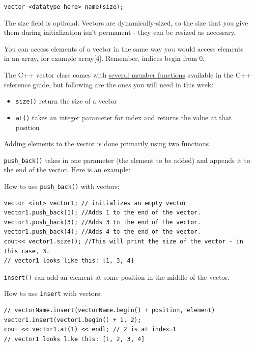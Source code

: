\texttt{vector <datatype_here> name(size);}

The size field is optional. Vectors are dynamically-sized, so the size that you give them during initialization isn't permanent - they can be resized as necessary.

You can access elements of a vector in the same way you would access elements in an array, for example array[4]. Remember, indices begin from 0.

The C++ vector class comes with \textcolor{cyan}{\href{https://www.cplusplus.com/reference/vector/vector/vector/}{several member functions}} available in the C++ reference guide, but following are the ones you will need in this week:

\begin{itemize}
    \item \texttt{size()} return the size of a vector
    \item \texttt{at()} takes an integer parameter for index and returns the value at that position
\end{itemize}

Adding elements to the vector is done primarily using two functions

\texttt{push_back()} takes in one parameter (the element to be added) and appends it to the end of the vector. Here is an example:

\begin{example}
    How to use \texttt{push_back()} with vectors:

    \begin{verbatim}
vector <int> vector1; // initializes an empty vector
vector1.push_back(1); //Adds 1 to the end of the vector. 
vector1.push_back(3); //Adds 3 to the end of the vector. 
vector1.push_back(4); //Adds 4 to the end of the vector. 
cout<< vector1.size(); //This will print the size of the vector - in this case, 3.
// vector1 looks like this: [1, 3, 4]
    \end{verbatim}
\end{example}

\texttt{insert()} can add an element at some position in the middle of the vector.

\begin{example}
    How to use \texttt{insert} with vectors:

    \begin{verbatim}
// vectorName.insert(vectorName.begin() + position, element)
vector1.insert(vector1.begin() + 1, 2);
cout << vector1.at(1) << endl; // 2 is at index=1
// vector1 looks like this: [1, 2, 3, 4]
    \end{verbatim}
\end{example}

